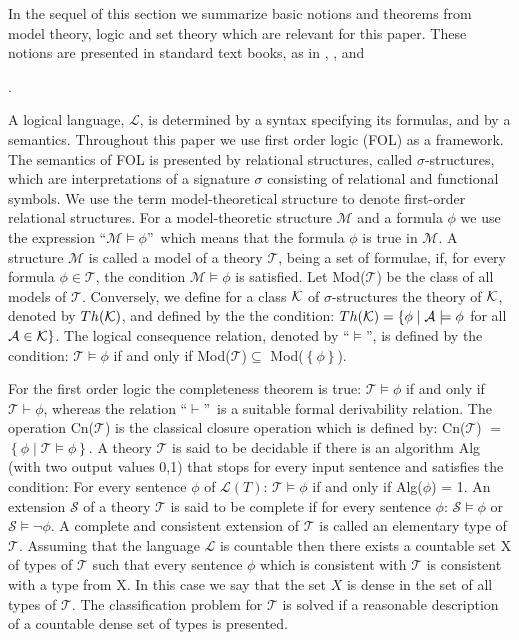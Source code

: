 \documentclass{ao2e}
\begin{document}
In the sequel of this section we summarize basic notions and theorems from model theory, logic and set theory which are relevant for this paper. These notions are presented in standard text books, as in
\cite{hodges-w-1993-a}, \cite{chang-cc-1977-a}, \cite{barwise-j-1985-a} and {\cite{devlin-k-1993-a}.

A logical language, $\mathcal{L}$, is determined by a syntax specifying its formulas, and by a semantics. Throughout this paper we use first order logic (FOL) as a framework.  The semantics of FOL is presented by relational structures, called $\sigma$-structures, which are interpretations of a signature $\sigma$ consisting of relational and functional symbols. We use the term model-theoretical structure to denote first-order relational structures. For a model-theoretic structure $\mathcal{M}$ and a formula $\phi$ we use the expression ``$\mathcal{M}\models\phi$''\ which means that the formula $\phi$ is true in $\mathcal{M}$. A structure $\mathcal{M}$ is called a model of a theory $\mathcal{T}$, being a set of formulae, if, for every formula $\phi\in\mathcal{T}$, the condition $\mathcal{M}\models\phi$ is satisfied. Let Mod($\mathcal{T}$) be the class of all models of $\mathcal{T}$. Conversely, we define for a class ${\cal K}$ of $\sigma$-structures the theory of
${\cal K}$, denoted by $Th({\cal K})$, and defined by the the condition: 
$Th({\cal K}) = \{ \phi \; | \; {\cal A} \models \phi$ for all ${\cal A} \in {\cal K} \}$.
The logical consequence relation, denoted by ``$\models$'', is defined by the condition: $\mathcal{T}\models\phi$ if and only if Mod($\mathcal{T}$)$\subseteq$ Mod($\left\{\phi\right\}$).

\hspace*{0.5cm}For the first order logic the completeness theorem is true: $\mathcal{T}\models\phi$ if and only if $\mathcal{T}\vdash\phi$, whereas the relation ``$\vdash$''\ is a suitable formal derivability relation. The operation Cn($\mathcal{T}$) is the classical closure operation which is defined by: Cn($\mathcal{T}$) $=$ $\left\{\phi \;| \; \mathcal{T}\models\phi\right\}$. A theory $\mathcal{T}$ is said to be decidable if there is an algorithm Alg (with two output values 0,1) that stops for every input sentence and satisfies the condition: For every sentence $\phi$ of $\mathcal{L}(T)$: $\mathcal{T}\models\phi$ if and only if Alg($\phi$) = 1.
    An extension $\mathcal{S}$ of a theory $\mathcal{T}$ is said to be complete if for every sentence $\phi$:  $\mathcal{S}\models\phi$ or $\mathcal{S}\models\neg\phi$. A complete and consistent extension of $\mathcal{T}$ is called an elementary type of $\mathcal{T}$. Assuming that the language $\mathcal{L}$ is countable then there exists a countable set X of types of $\mathcal{T}$ such that every sentence $\phi$ which is consistent with $\mathcal{T}$ is consistent with a type from X. In this case we say that the set $X$ is dense in the set of all types of $\mathcal{T}$.  The classification problem for $\mathcal{T}$ is solved if a reasonable description of a countable dense set of types is presented.


}
\end{document}
